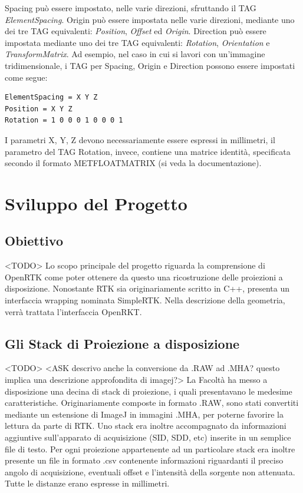 \documentclass[a4paper,12pt, doubleside]{report}
\begin{document}
                \bigskip
                \par
                    Spacing può essere impostato, nelle varie direzioni, sfruttando il TAG \textit{ElementSpacing}. Origin può essere impostata nelle varie direzioni, mediante uno dei tre TAG equivalenti: \textit{Position}, \textit{Offset} ed \textit{Origin}. Direction può essere impostata mediante uno dei tre TAG equivalenti: \textit{Rotation}, \textit{Orientation} e \textit{TransformMatrix}. Ad esempio, nel caso in cui si lavori con un'immagine tridimensionale, i TAG per Spacing, Origin e Direction possono essere impostati come segue:
                    
                    \begin{lstlisting}[language=bash, frame=bt]
ElementSpacing = X Y Z
Position = X Y Z
Rotation = 1 0 0 0 1 0 0 0 1
                    \end{lstlisting}
                    
                    I parametri X, Y, Z devono necessariamente essere espressi in millimetri, il parametro del TAG Rotation, invece, contiene una matrice identità, specificata secondo il formato MET\textunderscore FLOAT\textunderscore MATRIX (si veda la documentazione).
                                              
    \chapter{Sviluppo del Progetto}
        \section{Obiettivo}
            <TODO>
            Lo scopo principale del progetto riguarda la comprensione di OpenRTK come poter ottenere da questo una ricostruzione delle proiezioni a disposizione.
            Nonostante RTK sia originariamente scritto in C++, presenta un interfaccia wrapping nominata SimpleRTK. Nella descrizione della geometria, verrà trattata l'interfaccia OpenRKT.
         
        \section{Gli Stack di Proiezione a disposizione}
            <TODO>
            <ASK descrivo anche la conversione da .RAW ad .MHA? questo implica una descrizione approfondita di imagej?>
            La Facoltà ha messo a disposizione una decina di stack di proiezione, i quali presentavano le medesime caratteristiche. Originariamente composte in formato .RAW, sono stati convertiti mediante un estensione di ImageJ in immagini .MHA, per poterne favorire la lettura da parte di RTK. Uno stack era inoltre accompagnato da informazioni aggiuntive sull'apparato di acquisizione (SID, SDD, etc) inserite in un semplice file di testo. Per ogni proiezione appartenente ad un particolare stack era inoltre presente un file in formato .csv contenente informazioni riguardanti il preciso angolo di acquisizione, eventuali offset e l'intensità della sorgente non attenuata.
            Tutte le distanze erano espresse in millimetri.
            
\end{document}
